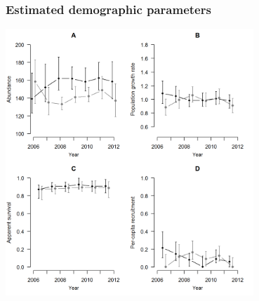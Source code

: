 \documentclass[color=usenames,dvipsnames]{beamer}
\begin{document}
\begin{frame}
\begin{columns}
\begin{column}{0.5\textwidth}
    \end{column}
  \end{columns}
\end{frame}


\begin{frame}
  \frametitle{Estimated demographic parameters}
  \begin{center}
    \includegraphics[width=0.7\textwidth]{figs/LA-bear-demographics}
  \end{center}
\end{frame}
\end{document}
